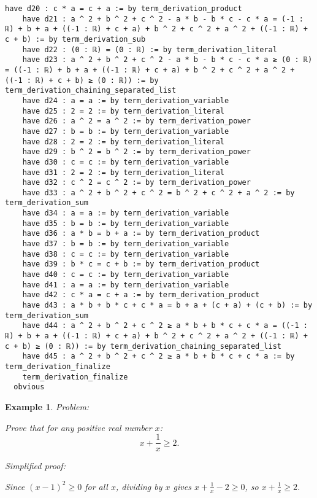 \documentclass{article}
\newtheorem{example}{Example}
\begin{document}
\begin{tcolorbox}[colback=white!10, width=\linewidth]
\begin{lstlisting}[language=Lean4]
    have d20 : c * a = c + a := by term_derivation_product
    have d21 : a ^ 2 + b ^ 2 + c ^ 2 - a * b - b * c - c * a = (-1 : ℝ) + b + a + ((-1 : ℝ) + c + a) + b ^ 2 + c ^ 2 + a ^ 2 + ((-1 : ℝ) + c + b) := by term_derivation_sub
    have d22 : (0 : ℝ) = (0 : ℝ) := by term_derivation_literal
    have d23 : a ^ 2 + b ^ 2 + c ^ 2 - a * b - b * c - c * a ≥ (0 : ℝ) = ((-1 : ℝ) + b + a + ((-1 : ℝ) + c + a) + b ^ 2 + c ^ 2 + a ^ 2 + ((-1 : ℝ) + c + b) ≥ (0 : ℝ)) := by term_derivation_chaining_separated_list
    have d24 : a = a := by term_derivation_variable
    have d25 : 2 = 2 := by term_derivation_literal
    have d26 : a ^ 2 = a ^ 2 := by term_derivation_power
    have d27 : b = b := by term_derivation_variable
    have d28 : 2 = 2 := by term_derivation_literal
    have d29 : b ^ 2 = b ^ 2 := by term_derivation_power
    have d30 : c = c := by term_derivation_variable
    have d31 : 2 = 2 := by term_derivation_literal
    have d32 : c ^ 2 = c ^ 2 := by term_derivation_power
    have d33 : a ^ 2 + b ^ 2 + c ^ 2 = b ^ 2 + c ^ 2 + a ^ 2 := by term_derivation_sum
    have d34 : a = a := by term_derivation_variable
    have d35 : b = b := by term_derivation_variable
    have d36 : a * b = b + a := by term_derivation_product
    have d37 : b = b := by term_derivation_variable
    have d38 : c = c := by term_derivation_variable
    have d39 : b * c = c + b := by term_derivation_product
    have d40 : c = c := by term_derivation_variable
    have d41 : a = a := by term_derivation_variable
    have d42 : c * a = c + a := by term_derivation_product
    have d43 : a * b + b * c + c * a = b + a + (c + a) + (c + b) := by term_derivation_sum
    have d44 : a ^ 2 + b ^ 2 + c ^ 2 ≥ a * b + b * c + c * a = ((-1 : ℝ) + b + a + ((-1 : ℝ) + c + a) + b ^ 2 + c ^ 2 + a ^ 2 + ((-1 : ℝ) + c + b) ≥ (0 : ℝ)) := by term_derivation_chaining_separated_list
    have d45 : a ^ 2 + b ^ 2 + c ^ 2 ≥ a * b + b * c + c * a := by term_derivation_finalize
    term_derivation_finalize
  obvious

\end{lstlisting}
\end{tcolorbox}


\begin{example}
Problem:
\begin{tcolorbox}[colback=yellow!10, width=\linewidth]
Prove that for any positive real number $x$:
    $$x + \frac{1}{x} \geq 2.$$
\end{tcolorbox}

Simplified proof:
\begin{tcolorbox}[colback=blue!10, width=\linewidth]
Since $(x-1)^2 \ge 0$ for all $x$, dividing by $x$ gives $x + \frac{1}{x} - 2 \ge 0$, so $x + \frac{1}{x} \ge 2$.
\end{tcolorbox}
\end{example}
\end{document}

